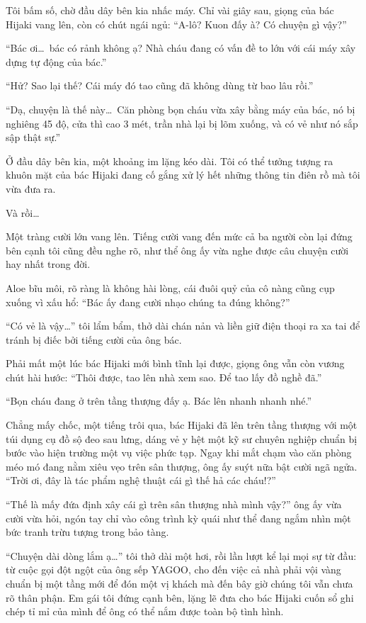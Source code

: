 \documentclass[../main.tex]{subfiles}
\begin{document}
Tôi bấm số, chờ đầu dây bên kia nhấc máy. Chỉ vài giây sau, giọng của bác Hijaki vang lên, còn có chút ngái ngủ: ``A-lô? Kuon đấy à? Có chuyện gì vậy?''

``Bác ơi\dots\ bác có rảnh không ạ? Nhà cháu đang có vấn đề to lớn với cái máy xây dựng tự động của bác.''

``Hử? Sao lại thế? Cái máy đó tao cũng đã không dùng từ bao lâu rồi.''

``Dạ, chuyện là thế này\dots\ Căn phòng bọn cháu vừa xây bằng máy của bác, nó bị nghiêng 45 độ, cửa thì cao 3 mét, trần nhà lại bị lõm xuống, và có vẻ như nó sắp sập thật sự.''

Ở đầu dây bên kia, một khoảng im lặng kéo dài. Tôi có thể tưởng tượng ra khuôn mặt của bác Hijaki đang cố gắng xử lý hết những thông tin điên rồ mà tôi vừa đưa ra.

Và rồi\dots

Một tràng cười lớn vang lên. Tiếng cười vang đến mức cả ba người còn lại đứng bên cạnh tôi cũng đều nghe rõ, như thể ông ấy vừa nghe được câu chuyện cười hay nhất trong đời.

Aloe bĩu môi, rõ ràng là không hài lòng, cái đuôi quỷ của cô nàng cũng cụp xuống vì xấu hổ: ``Bác ấy đang cười nhạo chúng ta đúng không?''

``Có vẻ là vậy\dots'' tôi lẩm bẩm, thở dài chán nản và liền giữ điện thoại ra xa tai để tránh bị điếc bởi tiếng cười của ông bác.

Phải mất một lúc bác Hijaki mới bình tĩnh lại được, giọng ông vẫn còn vương chút hài hước: ``Thôi được, tao lên nhà xem sao. Để tao lấy đồ nghề đã.''

``Bọn cháu đang ở trên tầng thượng đấy ạ. Bác lên nhanh nhanh nhé.''

\ct

Chẳng mấy chốc, một tiếng trôi qua, bác Hijaki đã lên trên tầng thượng với một túi dụng cụ đồ sộ đeo sau lưng, dáng vẻ y hệt một kỹ sư chuyên nghiệp chuẩn bị bước vào hiện trường một vụ việc phức tạp. Ngay khi mắt chạm vào căn phòng méo mó đang nằm xiêu vẹo trên sân thượng, ông ấy suýt nữa bật cười ngã ngửa. ``Trời ơi, đây là tác phẩm nghệ thuật cái gì thế hả các cháu!?''

``Thế là mấy đứa định xây cái gì trên sân thượng nhà mình vậy?'' ông ấy vừa cười vừa hỏi, ngón tay chỉ vào công trình kỳ quái như thể đang ngắm nhìn một bức tranh trừu tượng trong bảo tàng.

``Chuyện dài dòng lắm ạ\dots'' tôi thở dài một hơi, rồi lần lượt kể lại mọi sự từ đầu: từ cuộc gọi đột ngột của ông sếp YAGOO, cho đến việc cả nhà phải vội vàng chuẩn bị một tầng mới để đón một vị khách mà đến bây giờ chúng tôi vẫn chưa rõ thân phận. Em gái tôi đứng cạnh bên, lặng lẽ đưa cho bác Hijaki cuốn sổ ghi chép tỉ mỉ của mình để ông có thể nắm được toàn bộ tình hình.
\end{document}

